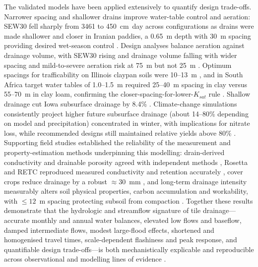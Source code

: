 \documentclass[11pt]{article}
\begin{document}
The validated models have been applied extensively to quantify design trade-offs. Narrower spacing and shallower drains improve water-table control and aeration: SEW30 fell sharply from 3461 to 450~cm~day across configurations as drains were made shallower and closer in Iranian paddies, a 0.65~m depth with 30~m spacing providing desired wet-season control \parencite{DarziNaftchali2013,DarziNaftchally2014}. Design analyses balance aeration against drainage volume, with SEW30 rising and drainage volume falling with wider spacing and mild-to-severe aeration risk at 75~m but not 25~m \parencite{Verma2014,Hirekhan2007}. Optimum spacings for trafficability on Illinois claypan soils were 10--13~m \parencite{MOSTAGHIMI1989}, and in South Africa target water tables of 1.0--1.5~m required 25--40~m spacing in clay versus 55--70~m in clay loam, confirming the closer-spacing-for-lower-$K_{sat}$ rule \parencite{Malota2015}. Shallow drainage cut Iowa subsurface drainage by 8.4\% \parencite{Zhou2013,Mendez2004}. Climate-change simulations consistently project higher future subsurface drainage (about 14--80\% depending on model and precipitation) concentrated in winter, with implications for nitrate loss, while recommended designs still maintained relative yields above 80\% \parencite{Singh2009,Chen2016,Feng2018}. Supporting field studies established the reliability of the measurement and property-estimation methods underpinning this modelling: drain-derived conductivity and drainable porosity agreed with independent methods \parencite{BUCKLAND1986}, Rosetta and RETC reproduced measured conductivity and retention accurately \parencite{Malota2022,Malota2024}, cover crops reduce drainage by a robust $\approx30$~mm \parencite{Meyer2019}, and long-term drainage intensity measurably alters soil physical properties, carbon accumulation and workability, with $\le12$~m spacing protecting subsoil from compaction \parencite{Omonode2025,Mante2022,Mante2018,Frison2009,Roy2020}. Together these results demonstrate that the hydrologic and streamflow signature of tile drainage---accurate monthly and annual water balances, elevated low flows and baseflow, damped intermediate flows, modest large-flood effects, shortened and homogenised travel times, scale-dependent flashiness and peak response, and quantifiable design trade-offs---is both mechanistically explicable and reproducible across observational and modelling lines of evidence \parencite{Ahmadi1995,HASEGAWA1994,GALLICHAND1992b,MCCARTHY1992,PalaciosVélez2004,Khan2007,Prathapar1996,Ghorbani2015,Skaggs2017,Singh2006,Singh1999,Gaj2022}.

\printbibliography
\end{document}
